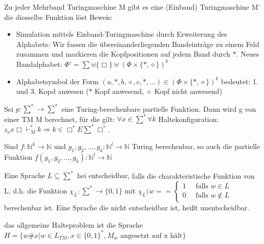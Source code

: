 \documentclass[avery5371]{flashcards}
\begin{document}
\begin{flashcard}[Satz]{ Zu jeder Mehrband Turingmaschine M gibt es} eine (Einband) Turingmaschine M' die diesselbe Funktion löst
Beweis:\begin{itemize}
\item Simulation mittels Einband-Turingmaschine durch Erweiterung des Alphabets: Wir fassen die übereinanderliegenden Bandeinträge zu einem Feld zusammen und markieren die Kopfpositionen auf jedem Band durch $\ast$. Neues Bandalphabet: $\Phi'=\sum\uplus\{\Box\}\uplus (\Phi\times\{\ast, \diamond\})^k$
\item Alphabetsymbol der Form $(a,\ast,b,\diamond,c,\ast,...)\in(\Phi\times\{\ast,\diamond\})^k$ bedeutet: 1. und 3. Kopd anwesen ($\ast$ Kopf anwesend, $\diamond$ Kopf nicht anwesend)
\end{itemize}
\end{flashcard}

\begin{flashcard}[Satz]{} Sei $g:\sum^*\rightarrow\sum^*$ eine Turing-berechenbare partielle Funktion. Dann wird g von einer TM M berechnet, für die gilt: $\forall x\in\sum^*\forall k$ Haltekonfiguration: $z_ox\Box\vdash_M^* k\Rightarrow k\in \Box^*E\sum^*\Box^*$.
\end{flashcard}

\begin{flashcard}[Satz]{} Sind $f:\mathbb{N}^k\rightarrow\mathbb{N}$ und $g_1,g_2,\dots,g_k:\mathbb{N}^l\rightarrow\mathbb{N}$ Turing berechenbar, so auch die partielle Funktion $f(g_1,g_2,\dots,g_k):\mathbb{N}^l\rightarrow\mathbb{N}$
\end{flashcard}

\begin{flashcard}[Definition]{ Eine Sprache $L\subseteq\sum^*$ hei entscheidbar,} falls die charakteristische Funktion von L, d.h. die Funktion $\chi_L:\sum^*\rightarrow\{0,1\}$ mit $\chi_L(w= = \begin{cases} 1 \quad\text{ falls } w\in L \\ 0 \quad\text{ falls } w\not\in L \end{cases}$ berechenbar ist. Eine Sprache die nicht entscheidbar ist, heißt unentscheidbar.
\end{flashcard}

\begin{flashcard}[Definition]{ das allgemeine Halteproblem ist die Sprache }$H=\{w\#x | w\in L_{TM}, x\in\{0,1\}^*, M_w \text{ angesetzt auf x hält}\}$
\end{flashcard}
\end{document}
